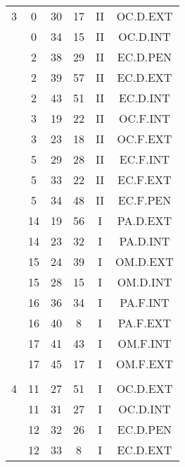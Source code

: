 \documentclass[12pt, a4paper]{article}
\begin{document}
\begin{multicols}{3}
{\begin{tabular}{c c c c c c}
	 	 	 	3 & 0 & 30 & 17 & II & OC.D.EXT\\%
	 	 	 	 & 0 & 34 & 15 & II & OC.D.INT\\%
	 	 	 	 & 2 & 38 & 29 & II & EC.D.PEN\\%
	 	 	 	 & 2 & 39 & 57 & II & EC.D.EXT\\%
	 	 	 	 & 2 & 43 & 51 & II & EC.D.INT\\%
	 	 	 	 & 3 & 19 & 22 & II & OC.F.INT\\%
	 	 	 	 & 3 & 23 & 18 & II & OC.F.EXT\\%
	 	 	 	 & 5 & 29 & 28 & II & EC.F.INT\\%
	 	 	 	 & 5 & 33 & 22 & II & EC.F.EXT\\%
	 	 	 	 & 5 & 34 & 48 & II & EC.F.PEN\\%
	 	 	 	 & 14 & 19 & 56 & I & PA.D.EXT\\%
	 	 	 	 & 14 & 23 & 32 & I & PA.D.INT\\%
	 	 	 	 & 15 & 24 & 39 & I & OM.D.EXT\\%
	 	 	 	 & 15 & 28 & 15 & I & OM.D.INT\\%
	 	 	 	 & 16 & 36 & 34 & I & PA.F.INT\\%
	 	 	 	 & 16 & 40 & 8 & I & PA.F.EXT\\%
	 	 	 	 & 17 & 41 & 43 & I & OM.F.INT\\%
	 	 	 	 & 17 & 45 & 17 & I & OM.F.EXT\\%
	 	 	 	 & & & & & \\%
	 	 	 	4 & 11 & 27 & 51 & I & OC.D.EXT\\%
	 	 	 	 & 11 & 31 & 27 & I & OC.D.INT\\%
	 	 	 	 & 12 & 32 & 26 & I & EC.D.PEN\\%
	 	 	 	 & 12 & 33 & 8 & I & EC.D.EXT\\%

\end{tabular}}
\end{multicols}
\end{document}

